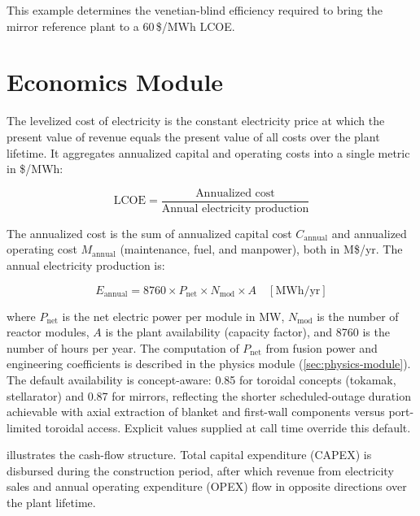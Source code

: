 \documentclass{article}
\begin{document}
This example determines the venetian-blind efficiency required to bring the
mirror reference plant to a 60\,\$/MWh LCOE.

\section{Economics Module}
\label{sec:lcoe}

The levelized cost of electricity is the constant electricity price at
which the present value of revenue equals the present value of all costs
over the plant lifetime. It aggregates annualized capital and operating
costs into a single metric in \$/MWh:

\begin{equation}
\label{eq:lcoe}
\text{LCOE} = \frac{\text{Annualized cost}}{\text{Annual electricity production}}
\end{equation}

\noindent The annualized cost is the sum of annualized capital cost
$C_{\text{annual}}$ and annualized operating cost $M_{\text{annual}}$
(maintenance, fuel, and manpower), both in M\$/yr. The annual electricity
production is:

\begin{equation}
\label{eq:e-annual}
E_{\text{annual}} = 8760 \times P_{\text{net}} \times N_{\text{mod}} \times A
\quad [\text{MWh/yr}]
\end{equation}

\noindent where $P_{\text{net}}$ is the net electric power per module in MW,
$N_{\text{mod}}$ is the number of reactor modules, $A$ is the plant
availability (capacity factor), and 8760 is the number of hours per year.
The computation of $P_{\text{net}}$ from fusion power and
engineering coefficients is described in the physics module
(\cref{sec:physics-module}).
The default availability is concept-aware: 0.85 for toroidal concepts
(tokamak, stellarator) and 0.87 for mirrors, reflecting the shorter
scheduled-outage duration achievable with axial extraction of blanket
and first-wall components versus port-limited toroidal access.
Explicit values supplied at call time override this default.

 illustrates the cash-flow structure. Total capital
expenditure (CAPEX) is disbursed during the construction period, after
which revenue from electricity sales and annual operating expenditure
(OPEX) flow in opposite directions over the plant lifetime.
\end{document}
